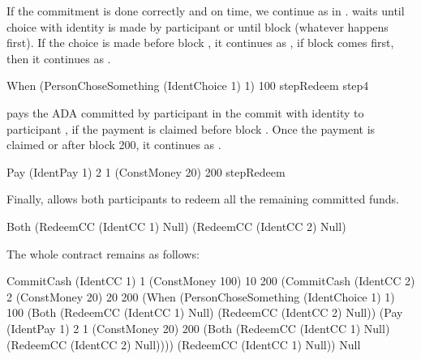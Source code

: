 \documentclass[runningheads]{llncs}
\begin{document}
{If the commitment is done correctly and on time, we continue as in . 
waits until choice with identity  is made by participant  or
until block  (whatever happens first). If the choice is made before block , 
it continues as , if block  comes first, then it continues as 
.

\begin{haskellcode}
When (PersonChoseSomething (IdentChoice 1) 1) 100
     stepRedeem
     step4
\end{haskellcode}

 pays the  ADA committed by participant  in the commit with 
identity  to participant , if the payment is claimed before block 
. Once the payment is claimed or after block 200, it continues as .

\begin{haskellcode}
Pay (IdentPay 1) 2 1 (ConstMoney 20) 200 stepRedeem
\end{haskellcode}

Finally,  allows both participants to redeem all the remaining committed funds.

\begin{haskellcode}
Both (RedeemCC (IdentCC 1) Null)
     (RedeemCC (IdentCC 2) Null)
\end{haskellcode}

The whole contract remains as follows:
\begin{haskellcode}
CommitCash (IdentCC 1) 1
           (ConstMoney 100)
           10 200
           (CommitCash (IdentCC 2) 2
                       (ConstMoney 20)
                       20 200
                       (When (PersonChoseSomething (IdentChoice 1) 1)
                             100
                             (Both (RedeemCC (IdentCC 1) Null)
                                   (RedeemCC (IdentCC 2) Null))
                             (Pay (IdentPay 1) 2 1
                                  (ConstMoney 20)
                                  200
                                  (Both (RedeemCC (IdentCC 1) Null)
                                        (RedeemCC (IdentCC 2) Null))))
                       (RedeemCC (IdentCC 1) Null))
           Null
\end{haskellcode}

}
\end{document}
